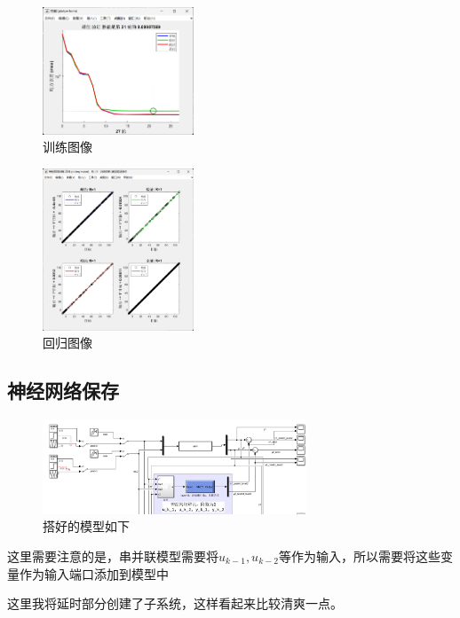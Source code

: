 \documentclass[12pt,a4paper,UTF8]{article}
\begin{document}
\begin{figure}[htbp] \centering \includegraphics[width=0.4\textwidth]{figures/2024-12-24-00-01-25.png} \caption{训练图像} \label{  }\end{figure}

\begin{figure}[htbp] \centering \includegraphics[width=0.4\textwidth]{figures/2024-12-24-00-01-58.png} \caption{回归图像} \label{  }\end{figure}


\subsection{神经网络保存}

\begin{figure}[htbp] \centering \includegraphics[width=0.7\textwidth]{figures/2024-12-23-23-58-06.png} \caption{搭好的模型如下} \label{  }\end{figure}

这里需要注意的是，串并联模型需要将$u_{k-1}, u_{k-2}$等作为输入，所以需要将这些变量作为输入端口添加到模型中

这里我将延时部分创建了子系统，这样看起来比较清爽一点。
\end{document}
